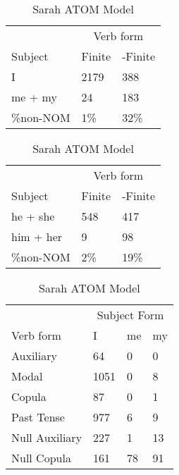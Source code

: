 \begin{table}[]
\caption{Sarah ATOM Model}
    \begin{minipage}{0.5\textwidth}
    \centering
    \begin{tabular}{@{}lll@{}}
        \toprule
         & \multicolumn{2}{c}{Verb form}\\
         \cline{2-3}
        Subject & Finite & -Finite \\
        \midrule
        I & 2179 & 388 \\
        me + my & 24 & 183 \\
        \hline
        \%non-NOM & 1\% & 32\% \\
        \bottomrule
    \end{tabular}
    \end{minipage}
    \begin{minipage}{0.5\textwidth}
        \centering
    \begin{tabular}{@{}lll@{}}
        \toprule
         & \multicolumn{2}{c}{Verb form}\\
         \cline{2-3}
        Subject & Finite & -Finite \\
        \midrule
        he + she & 548 & 417 \\
        him + her & 9 & 98 \\
        \hline
        \%non-NOM & 2\% & 19\% \\
        \bottomrule
    \end{tabular}
    \end{minipage}
    \begin{minipage}{0.5\textwidth}
        \centering
    \begin{tabular}{@{}llll@{}}
        \toprule
            &\multicolumn{3}{c}{Subject Form}\\
            \cline{2-4}
        Verb form & I & me & my \\
        \midrule
        Auxiliary & 64 & 0 & 0 \\
        Modal & 1051 & 0 & 8 \\
        Copula & 87 & 0 & 1 \\
        Past Tense & 977 & 6 & 9 \\
        \hline
        Null Auxiliary & 227 & 1 & 13 \\
        Null Copula & 161 & 78 & 91 \\
        \bottomrule
    \end{tabular}

\end{minipage}
\end{table}
